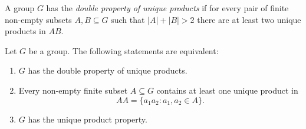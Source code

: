 \begin{graybox}

\begin{definition}
	A group $G$ has the \emph{double property of unique products} 
	if for every pair of finite non-empty subsets $A,B\subseteq G$ such that 
	$|A|+|B|>2$ there are at least two unique products in $AB$.
\end{definition}

\begin{theorem}[Strojnowski]
	\label{theorem:Strojnowski}
	Let $G$ be a group. The following statements are equivalent:
	\begin{enumerate}
		\item $G$ has the double property of unique products. 
		\item Every non-empty finite subset $A\subseteq G$ contains at least one unique product 
			in 
   \[
   AA=\{a_1a_2:a_1,a_2\in A\}.
   \]
		\item $G$ has the unique product property.
	\end{enumerate}
\end{theorem}


\end{graybox}

